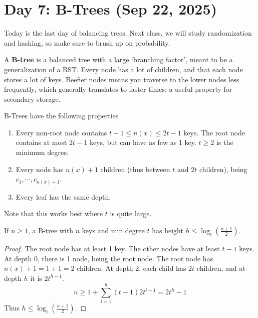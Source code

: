 \section{Day 7: B-Trees (Sep 22, 2025)}

Today is the last day of balancing trees. Next class, we will study randomization and hashing, so make sure to brush up on probability.

A \textbf{B-tree} is a balanced tree with a large `branching factor', meant to be a generalization of a BST. Every node has a lot of children, and that each node stores a lot of keys. Beefier nodes means you traverse to the lower nodes less frequently, which generally translates to faster times: a useful property for secondary storage.

\begin{definition}[B-Tree]
    B-Trees have the following properties
\begin{enumerate}
    \item Every non-root node contains $t - 1 \leq n(x) \leq 2t - 1$ keys. The root node contains at most $2t - 1$ keys, but can have as few as 1 key. $t \geq 2$ is the minimum degree.
    \item Every node has $n(x) + 1$ children (thus between $t$ and $2t$ children), being $c_1, \cdots, c_{n(x)+1}$.
    \item Every leaf has the same depth.
\end{enumerate}
\end{definition}

Note that this works best where $t$ is quite large. 

\begin{simplethm}
If $n \geq 1$, a B-tree with $n$ keys and min degree $t$ has height $h \leq \log_t (\frac{n+1}{2})$.
\end{simplethm}
\begin{proof}
    The root node has at least 1 key. The other nodes have at least $t - 1$ keys. At depth 0, there is 1 node, being the root node. The root node has $n(x) + 1 = 1 + 1 = 2$ children. At depth 2, each child has $2t$ children, and at depth $h$ it is $2t^{h-1}$.
    \[
    n \geq 1 + \sum_{i=1}^{h} (t-1)2t^{i-1} = 2t^h-1
    \]
    Thus $h \leq \log_t (\frac{n+1}{2})$.
\end{proof}

